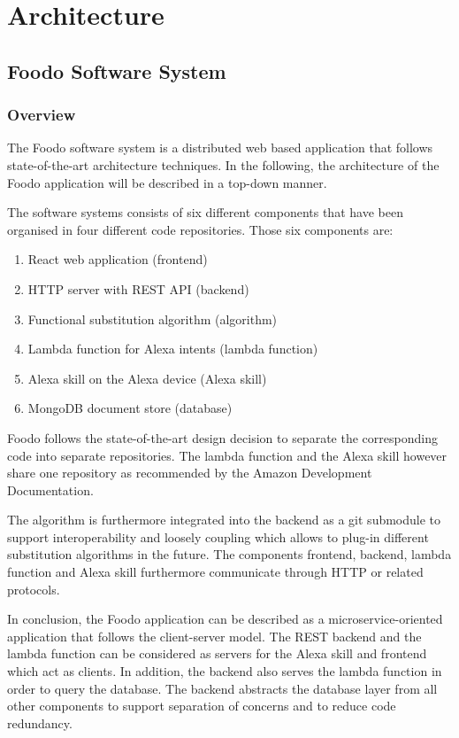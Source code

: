 \chapter{Architecture}
\section{Foodo Software System}
\subsection*{Overview}
The Foodo software system is a distributed web based application that follows state-of-the-art architecture techniques. In the following, the architecture of the Foodo application will be described in a top-down manner.
 
The software systems consists of six different components that have been organised in four different code repositories. Those six components are:
\begin{enumerate}
	\itemsep-0.5em 
	\item React web application (frontend)
	\item HTTP server with REST API (backend)
	\item Functional substitution algorithm (algorithm)
	\item Lambda function for Alexa intents (lambda function)
	\item Alexa skill on the Alexa device (Alexa skill)
	\item MongoDB document store (database)
\end{enumerate}

Foodo follows the state-of-the-art design decision to separate the corresponding code into separate repositories. The lambda function and the Alexa skill however share one repository as recommended by the Amazon Development Documentation. 

The algorithm is furthermore integrated into the backend as a git submodule to support interoperability and loosely coupling which allows to plug-in different substitution algorithms in the future. The components frontend, backend, lambda function and Alexa skill furthermore communicate through HTTP or related protocols. 

In conclusion, the Foodo application can be described as a microservice-oriented application that follows the client-server model. The REST backend and the lambda function can be considered as servers for the Alexa skill and frontend which act as clients. In addition, the backend also serves the lambda function in order to query the database. The backend abstracts the database layer from all other components to support separation of concerns and to reduce code redundancy. 
\clearpage
